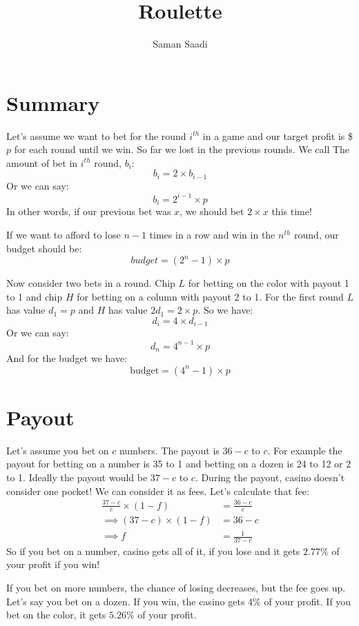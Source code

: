 \documentclass{book}
\title{Roulette}
\author{Saman Saadi}
\date{}
\begin{document}
	\frontmatter
	\maketitle
	\mainmatter
	\section{Summary}
	Let's assume we want to bet for the round $i^{th}$ in a game and our target profit is \$$p$ for each round until we win. So far we lost in the previous rounds. We call The amount of bet in $i^{th}$ round, $b_i$:
	\begin{equation*}
		b_i = 2 \times b_{i - 1}
	\end{equation*}
	Or we can say:
	\begin{equation*}
		b_i = 2^{i - 1} \times p
	\end{equation*}
	In other words, if our previous bet was $x$, we should bet $2 \times x$ this time!
	\par If we want to afford to lose ${n - 1}$ times in a row and win in the $n^{th}$ round, our budget should be:
	\begin{equation*}
		budget = (2^n - 1) \times p
	\end{equation*}
	\par Now consider two bets in a round. Chip $L$ for betting on the color with payout 1 to 1 and chip $H$ for betting on a column with payout 2 to 1. For the first round $L$ has value $d_1 = p$ and $H$ has value $2d_1 = 2 \times p$. So we have:
	\begin{equation*}
		d_i = 4 \times d_{i - 1}
	\end{equation*}
	Or we can say:
	\begin{equation*}
		d_n = 4^{n - 1} \times p
	\end{equation*}
	And for the budget we have:
	\begin{equation*}
		\text{budget} = (4^n - 1) \times p
	\end{equation*}
	\section{Payout}
	Let's assume you bet on $c$ numbers. The payout is $36 - c$ to $c$. For example the payout for betting on a number is 35 to 1 and betting on a dozen is 24 to 12 or 2 to 1. Ideally the payout would be $37 - c$ to $c$. During the payout, casino doesn't consider one pocket! We can consider it as fees. Let's calculate that fee:
	\begin{equation*}
		\begin{split}
			\frac{37 - c}{c} \times (1 - f) &= \frac{36 - c}{c} \\
			\implies (37 - c) \times (1 - f) &= 36 - c \\
			\implies f &= \frac{1}{37 - c}
		\end{split}
	\end{equation*}
	So if you bet on a number, casino gets all of it, if you lose and it gets $2.77\%$ of your profit if you win!
	\par If you bet on more numbers, the chance of losing decreases, but the fee goes up. Let's say you bet on a dozen. If you win, the casino gets $4\%$ of your profit. If you bet on the color, it gets $5.26\%$ of your profit.
\end{document}

